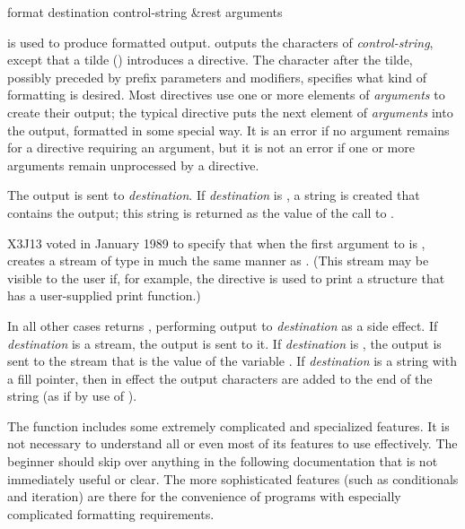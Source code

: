 \begin{defun}[Function]
format destination control-string &rest arguments

 is used to produce formatted output.
 outputs the characters of {\it control-string},
except that a tilde (\cd{{\Xtilde}}) introduces a directive.
The character after
the tilde, possibly preceded by prefix parameters and modifiers, specifies
what kind of formatting is desired.  Most directives use one or more
elements of {\it arguments} to create their output; the typical directive
puts the next element of {\it arguments} into the output, formatted in
some special way.  It is an error if no argument remains for a directive
requiring an argument, but it is not an error if one or more arguments
remain unprocessed by a directive.

The output is sent to {\it destination}.  If {\it destination} is
{\false}, a string is created that contains the output; this string is
returned as the value of the call to .

\begin{new}
X3J13 voted in January 1989
to specify that when the first argument
to  is ,  creates a stream
of type  in much the same manner as .
(This stream may be visible to the user if, for example, the 
directive is used to print a  structure that has a user-supplied
print function.)
\end{new}

In all other cases
 returns {\false}, performing output to {\it destination}
as a side effect.
If {\it destination} is a stream, the output is sent to it.  If
{\it destination} is {\true}, the output is sent to the stream
that is the value of the variable .
If {\it destination} is a string with a fill pointer, then
in effect the output characters are added to the end of the string
(as if by use of ).

The  function includes some extremely complicated and specialized
features.  It is not necessary to understand all or even most of its
features to use  effectively.  The beginner should
skip over anything in the following documentation that is not
immediately useful or clear.  The more sophisticated features
(such as conditionals and iteration) are
there for the convenience of programs with especially complicated formatting
requirements.


\end{defun}
